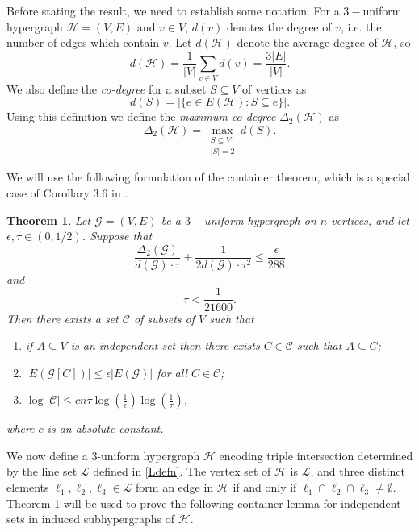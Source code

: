 \documentclass[11pt]{amsart}
\newcommand{\cH}{\mathcal{H}}
\newcommand{\cG}{\mathcal{G}}
\newcommand{\cC}{\mathcal{C}}
\newtheorem{theorem}{Theorem}
\theoremstyle{remark}
\begin{document}
Before stating the result, we need to establish some notation. For a $3-$uniform hypergraph $\cH=(V,E)$ and $v \in V$, $d(v)$ denotes the degree of $v$, i.e. the number of edges which contain $v$. Let $d(\cH)$ denote the average degree of $\cH$, so
\begin{equation} \label{ddefn}
d(\cH)= \frac{1}{|V|}\sum_{v \in V} d(v)=  \frac{3|E|}{|V|}.
\end{equation}
We also define the \emph{co-degree} for a subset $S \subseteq V$ of vertices as
$$d(S) = |\{ e \in E(\cH) : S \subseteq e \}|.$$
Using this definition we define the \emph{maximum co-degree} $\Delta_2(\mathcal H)$ as
$$\Delta_2(\cH) = \max_{\substack{S \subseteq V \\ |S| = 2}}d(S).$$

We will use the following formulation of the container theorem, which is a special case of Corollary 3.6 in \cite{SaTh}.

\begin{theorem} \label{thm:container}
Let $\cG=(V,E)$ be a $3-$uniform hypergraph on $n$ vertices, and let $\epsilon, \tau \in (0,1/2)$. Suppose that
\begin{equation} \label{cond1} 
\frac{\Delta_2(\cG)}{d(\cG) \cdot \tau}+ \frac{1}{2d(\cG) \cdot \tau^{2}} \leq \frac{\epsilon}{288}
\end{equation}
and
\begin{equation} \label{cond2}
\tau < \frac{1}{21600}.
\end{equation}
Then there exists a set $\cC$ of subsets of $V$ such that
\begin{enumerate}
    \item if $A \subseteq V$ is an independent set then there exists $C \in \cC$ such that $A \subseteq C$;
    \item $|E(\cG[C])| \leq \epsilon |E(\cG)|$ for all $C \in \cC$;
    \item $\log |\cC| \leq c n  \tau \log(\frac{1}{\epsilon})  \log(\frac{1}{\tau})$,  
\end{enumerate}
where $c$ is an absolute constant.
\end{theorem}

We now define a $3$-uniform hypergraph $\mathcal H$ encoding triple intersection determined by the line set $\mathcal L$ defined in \eqref{Ldefn}. The vertex set of $\mathcal H$ is $\mathcal L$, and three distinct elements $\ell_1, \ell_2, \ell_3 \in  \mathcal L$ form an edge in $\mathcal H$ if and only if $\ell_1 \cap \ell_2 \cap \ell_3 \neq \emptyset$. Theorem \ref{thm:container} will be used to prove the following container lemma for independent sets in induced subhypergraphs of $\mathcal H$.
\end{document}
